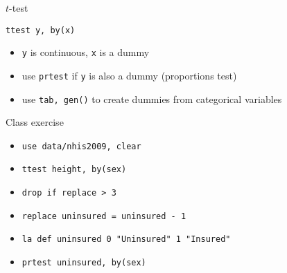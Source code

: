 \documentclass[t]{beamer}
\begin{document}
	\begin{frame}[t]{$t$-test}
		
		\begin{block}{\texttt{ttest y, by(x)}}

			\begin{itemize}
				\item \texttt{y} is continuous, \texttt{x} is a dummy
				\item use \texttt{prtest} if \texttt{y} is also a dummy (proportions test)
				\item use \texttt{tab, gen()} to create dummies from categorical variables
			\end{itemize}

		\end{block}

        \begin{exampleblock}{Class exercise}
								
					\begin{itemize}
						\item \texttt{use data/nhis2009, clear}
						\item \texttt{ttest height, by(sex)}
						\item \texttt{drop if replace > 3}
						\item \texttt{replace uninsured = uninsured - 1}
						\item \texttt{la def	 uninsured 0 "Uninsured" 1 "Insured"}
						\item \texttt{prtest uninsured, by(sex)}
					\end{itemize}
			
        \end{exampleblock}
	
	\end{frame}
	
	
\end{document}
